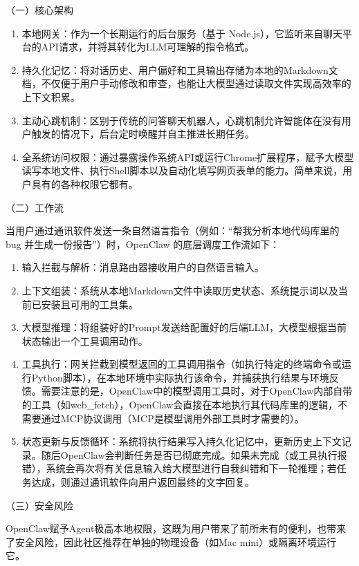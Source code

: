 （一）核心架构

\begin{enumerate}
\def\labelenumi{\arabic{enumi}.}
\item
  本地网关：作为一个长期运行的后台服务（基于 Node.js），它监听来自聊天平台的API请求，并将其转化为LLM可理解的指令格式。
\item
  持久化记忆：将对话历史、用户偏好和工具输出存储为本地的Markdown文档，不仅便于用户手动修改和审查，也能让大模型通过读取文件实现高效率的上下文积累。
\item
  主动心跳机制：区别于传统的问答聊天机器人，心跳机制允许智能体在没有用户触发的情况下，后台定时唤醒并自主推进长期任务。
\item
  全系统访问权限：通过暴露操作系统API或运行Chrome扩展程序，赋予大模型读写本地文件、执行Shell脚本以及自动化填写网页表单的能力。简单来说，用户具有的各种权限它都有。
\end{enumerate}

（二）工作流

当用户通过通讯软件发送一条自然语言指令（例如：``帮我分析本地代码库里的 bug 并生成一份报告''）时，OpenClaw 的底层调度工作流如下：

\begin{enumerate}
\def\labelenumi{\arabic{enumi}.}
\item
  输入拦截与解析：消息路由器接收用户的自然语言输入。
\item
  上下文组装：系统从本地Markdown文件中读取历史状态、系统提示词以及当前已安装且可用的工具集。
\item
  大模型推理：将组装好的Prompt发送给配置好的后端LLM，大模型根据当前状态输出一个工具调用动作。
\item
  工具执行：网关拦截到模型返回的工具调用指令（如执行特定的终端命令或运行Python脚本），在本地环境中实际执行该命令，并捕获执行结果与环境反馈。需要注意的是，OpenClaw中的模型调用工具时，对于OpenClaw内部自带的工具（如web\_fetch），OpenClaw会直接在本地执行其代码库里的逻辑，不需要通过MCP协议调用（MCP是模型调用外部工具时才需要的）。
\item
  状态更新与反馈循环：系统将执行结果写入持久化记忆中，更新历史上下文记录。随后OpenClaw会判断任务是否已彻底完成。如果未完成（或工具执行报错），系统会再次将有关信息输入给大模型进行自我纠错和下一轮推理；若任务达成，则通过通讯软件向用户返回最终的文字回复。
\end{enumerate}

（三）安全风险

OpenClaw赋予Agent极高本地权限，这既为用户带来了前所未有的便利，也带来了安全风险，因此社区推荐在单独的物理设备（如Mac mini）或隔离环境运行它。

